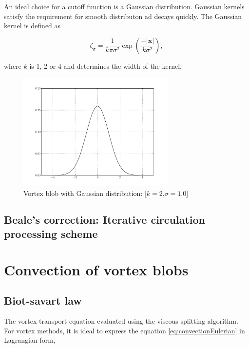 An ideal choice for a cutoff function is a Gaussian distribution. Gaussian kernels satisfy the requirement for smooth distributon ad decays quickly. The Gaussian kernel is defined as

\begin{equation}
\zeta_{\sigma} = \frac{1}{k\pi\sigma^2}\exp\left(\frac{-\left|\mathbf{x}\right|}{k\sigma^2}\right),
\end{equation}

where $k$ is 1, 2 or 4 and determines the width of the kernel.

\begin{figure}
	\centering
	\includegraphics[width=0.7\textwidth]{figures/theory/gaussianKernel.pdf}
	\caption{Vortex blob with Gaussian distribution: [$k=2$,$\sigma=1.0$]}
\end{figure}


\subsection{Beale's correction: Iterative circulation processing scheme}


\section{Convection of vortex blobs}


\subsection{Biot-savart law}
The vortex transport equation evaluated using the viscous splitting algorithm. For vortex methods, it is ideal to express the equation \ref{eq:convectionEulerian} in Lagrangian form,

